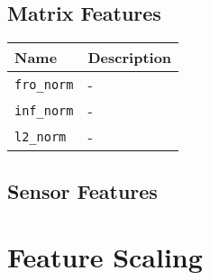 \subsection{Matrix Features}
\begin{center}
  \begin{tabular}{ | l | l |}
  \hline
  Name & Description \\
  \hline
    \texttt{fro\_norm} & - \\
    \texttt{inf\_norm} & - \\
    \texttt{l2\_norm} & - \\
  \hline
  \end{tabular}
\end{center}
\subsection{Sensor Features}
\section{Feature Scaling}
